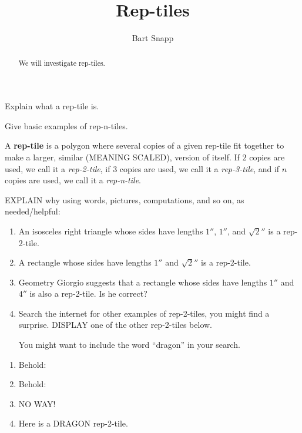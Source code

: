 \documentclass[handout,nooutcomes,noauthor,hints]{ximera}
\title{Rep-tiles}
\author{Bart Snapp}
\begin{document}
\begin{abstract}
  We will investigate rep-tiles.
\end{abstract}
\maketitle



\begin{listOutcomes}
\item Explain what a rep-tile is.
\item Give basic examples of rep-n-tiles.
\end{listOutcomes}


A \textbf{rep-tile} is a polygon where several copies
of a given rep-tile fit together to make a larger, similar (MEANING
SCALED), version of itself. If $2$ copies are used, we call it a
\textit{rep-2-tile}, if $3$ copies are used, we call it a
\textit{rep-3-tile}, and if $n$ copies are used, we call it a
\textit{rep-n-tile}.

\mynewpage

\begin{question}
EXPLAIN why using words, pictures, computations, and so on, as
needed/helpful:
\begin{enumerate}
\item An isosceles right triangle whose sides have lengths $1''$,
  $1''$, and $\sqrt{2}''$ is a rep-2-tile.
\item A rectangle whose sides have lengths $1''$ and $\sqrt{2}''$ is a
  rep-2-tile.
\item Geometry Giorgio suggests that a rectangle whose sides have
  lengths $1''$ and $4''$ is also a rep-2-tile. Is he correct?
  \item Search the internet for other examples of rep-2-tiles, you
    might find a surprise. DISPLAY one of the other rep-2-tiles below.
    \begin{hint}
      You might want to include the word ``dragon'' in your
      search.
    \end{hint}
\end{enumerate}
\begin{freeResponse}
  \begin{enumerate}
  \item Behold:
  \item Behold:
  \item NO WAY!
  \item Here is a DRAGON rep-2-tile.
  \end{enumerate}
\end{freeResponse}
\end{question}
\mynewpage
\end{document}
